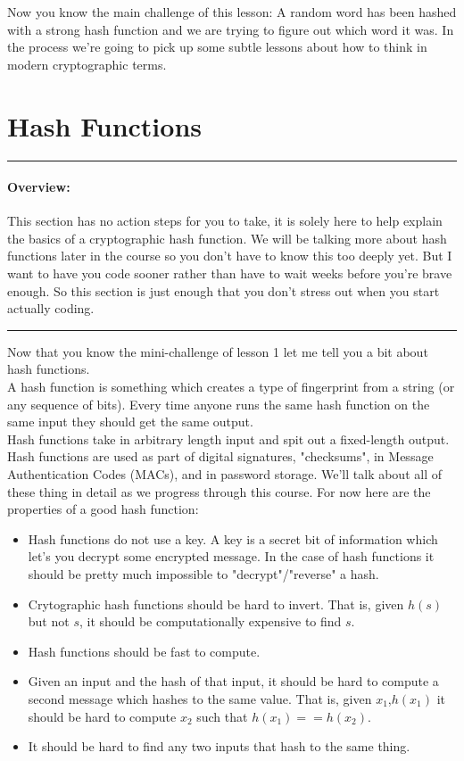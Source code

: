 \documentclass[12pt]{book}
\newenvironment{overview}
  {\noindent\rule{\textwidth}{0.4pt}
  \paragraph{Overview:}
  }
  {\par
  \noindent\rule{\textwidth}{0.4pt}
  }
\begin{document}
 Now you know the main challenge of this lesson: A random word has been hashed with a strong hash function and we are trying to figure out which word it was. In the process we're going to pick up some subtle lessons about how to think in modern cryptographic terms.
\newpage

\section{Hash Functions}

\begin{overview}
This section has no action steps for you to take, it is solely here to help explain the basics of a cryptographic hash function. We will be talking more about hash functions later in the course so you don't have to know this too deeply yet. But I want to have you code sooner rather than have to wait weeks before you're brave enough. So this section is just enough that you don't stress out when you start actually coding.
\end{overview}

Now that you know the mini-challenge of lesson 1 let me tell you a bit about hash functions.\\

A hash function is something which creates a type of fingerprint from a string (or any sequence of bits). Every time anyone runs the same hash function on the same input they should get the same output.\\

Hash functions take in arbitrary length input and spit out a fixed-length output.\\

Hash functions are used as part of digital signatures, "checksums", in Message Authentication Codes (MACs), and in password storage. We'll talk about all of these thing in detail as we progress through this course. For now here are the properties of a good hash function:

\begin{itemize}
  \item Hash functions do not use a key. A key is a secret bit of information which let's you decrypt some encrypted message. In the case of hash functions it should be pretty much impossible to "decrypt"/"reverse" a hash.
  \item Crytographic hash functions should be hard to invert. That is, given $h(s)$ but not $s$, it should be computationally expensive to find $s$.
  \item Hash functions should be fast to compute.
  \item Given an input and the hash of that input, it should be hard to compute a second message which hashes to the same value. That is, given $x_1$,$h(x_1)$ it should be hard to compute $x_2$ such that $h(x_1)==h(x_2)$.
  \item It should be hard to find any two inputs that hash to the same thing.
\end{itemize}
\end{document}

